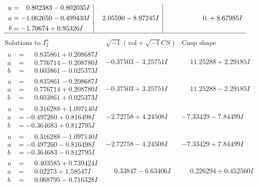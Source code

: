 \documentclass[1p]{elsarticle_modified}
\theoremstyle{definition}
\newcommand{\I}{\sqrt{-1}}
\begin{document}
$$\begin{array}{c|c|c}
\begin{aligned}
u &= \phantom{-}0.802383 - 0.802035 I \\
a &= -1.062650 - 0.499433 I \\
b &= -1.70674 + 0.95326 I\end{aligned}
 & \phantom{-}2.05590 - 8.97245 I & \phantom{-0.000000 -}0. + 8.67985 I\\
 \hline 
 \end{array}$$\newpage$$\begin{array}{c|c|c}  
\text{Solutions to }I^u_{2}& \I (\text{vol} + \sqrt{-1}CS) & \text{Cusp shape}\\
 \hline 
\begin{aligned}
u &= \phantom{-}0.835861 + 0.208687 I \\
a &= \phantom{-}0.776714 - 0.208780 I \\
b &= \phantom{-}0.603861 - 0.025373 I\end{aligned}
 & -0.37503 - 3.25751 I & \phantom{-}11.25288 + 2.29185 I \\ \hline\begin{aligned}
u &= \phantom{-}0.835861 - 0.208687 I \\
a &= \phantom{-}0.776714 + 0.208780 I \\
b &= \phantom{-}0.603861 + 0.025373 I\end{aligned}
 & -0.37503 + 3.25751 I & \phantom{-}11.25288 - 2.29185 I \\ \hline\begin{aligned}
u &= \phantom{-}0.316288 + 1.097140 I \\
a &= -0.497260 + 0.816498 I \\
b &= -0.364683 + 0.812795 I\end{aligned}
 & -2.72758 + 4.24508 I & -7.33429 - 7.84499 I \\ \hline\begin{aligned}
u &= \phantom{-}0.316288 - 1.097140 I \\
a &= -0.497260 - 0.816498 I \\
b &= -0.364683 - 0.812795 I\end{aligned}
 & -2.72758 - 4.24508 I & -7.33429 + 7.84499 I \\ \hline\begin{aligned}
u &= \phantom{-}0.403585 + 0.739424 I \\
a &= \phantom{-}0.02273 + 1.58547 I \\
b &= \phantom{-}0.068795 - 0.716328 I\end{aligned}
 & \phantom{-}0.33847 - 6.63406 I & \phantom{-}0.226294 + 0.452560 I \\ \hline\begin{aligned}

\end{aligned}
\end{array}$$
\end{document}
